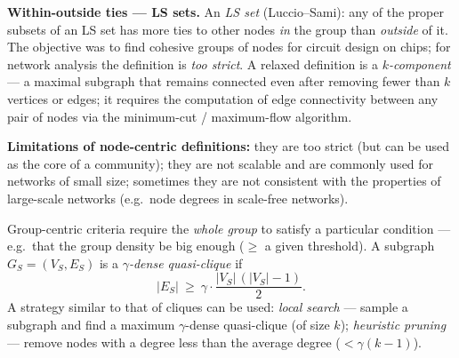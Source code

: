 \documentclass[11pt,a4paper]{article}
\theoremstyle{definition}
\begin{document}
\begin{defbox}
\textbf{Within-outside ties --- LS sets.} An \emph{LS set} (Luccio--Sami): any of the proper subsets of
an LS set has more ties to other nodes \emph{in} the group than \emph{outside} of it. The objective was
to find cohesive groups of nodes for circuit design on chips; for network analysis the definition is
\emph{too strict}. A relaxed definition is a \emph{$k$-component} --- a maximal subgraph that remains
connected even after removing fewer than $k$ vertices or edges; it requires the computation of edge
connectivity between any pair of nodes via the minimum-cut / maximum-flow algorithm.

\textbf{Limitations of node-centric definitions:} they are too strict (but can be used as the core of
a community); they are not scalable and are commonly used for networks of small size; sometimes they
are not consistent with the properties of large-scale networks (e.g.\ node degrees in scale-free
networks).
\end{defbox}

\begin{defbox}
Group-centric criteria require the \emph{whole group} to satisfy a particular condition --- e.g.\ that
the group density be big enough ($\ge$ a given threshold). A subgraph $G_S=(V_S,E_S)$ is a
\emph{$\gamma$-dense quasi-clique} if
\[ |E_S|\ \ge\ \gamma\cdot\frac{|V_S|\,(|V_S|-1)}{2}. \]
A strategy similar to that of cliques can be used: \emph{local search} --- sample a subgraph and find a
maximum $\gamma$-dense quasi-clique (of size $k$); \emph{heuristic pruning} --- remove nodes with a
degree less than the average degree ($<\gamma(k-1)$).
\end{defbox}
\end{document}
